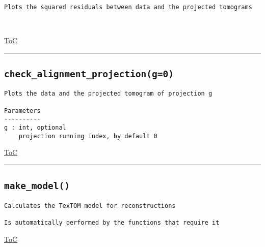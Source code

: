 \documentclass{article}
\begin{document}
\begin{lstlisting}[language=docstring]
Plots the squared residuals between data and the projected tomograms

    
\end{lstlisting}

\begin{flushright}

\hyperref[toc]{ToC}

\end{flushright}



\vspace{5mm}

\hrule

\subsection*{\texttt{check\_alignment\_projection(g=0)}}

\begin{lstlisting}[language=docstring]
Plots the data and the projected tomogram of projection g

Parameters
----------
g : int, optional
    projection running index, by default 0
\end{lstlisting}

\begin{flushright}

\hyperref[toc]{ToC}

\end{flushright}



\vspace{5mm}

\hrule

\subsection*{\texttt{make\_model()}}

\begin{lstlisting}[language=docstring]
Calculates the TexTOM model for reconstructions

Is automatically performed by the functions that require it
\end{lstlisting}

\begin{flushright}

\hyperref[toc]{ToC}

\end{flushright}
\end{document}
